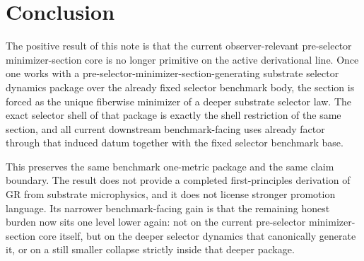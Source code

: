 \documentclass[11pt]{article}
\begin{document}
\section{Conclusion}

The positive result of this note is that the current observer-relevant pre-selector minimizer-section core is no longer primitive on the active derivational line. Once one works with a pre-selector-minimizer-section-generating substrate selector dynamics package over the already fixed selector benchmark body, the section is forced as the unique fiberwise minimizer of a deeper substrate selector law. The exact selector shell of that package is exactly the shell restriction of the same section, and all current downstream benchmark-facing uses already factor through that induced datum together with the fixed selector benchmark base.

This preserves the same benchmark one-metric package and the same claim boundary. The result does not provide a completed first-principles derivation of GR from substrate microphysics, and it does not license stronger promotion language. Its narrower benchmark-facing gain is that the remaining honest burden now sits one level lower again: not on the current pre-selector minimizer-section core itself, but on the deeper selector dynamics that canonically generate it, or on a still smaller collapse strictly inside that deeper package.
\end{document}
